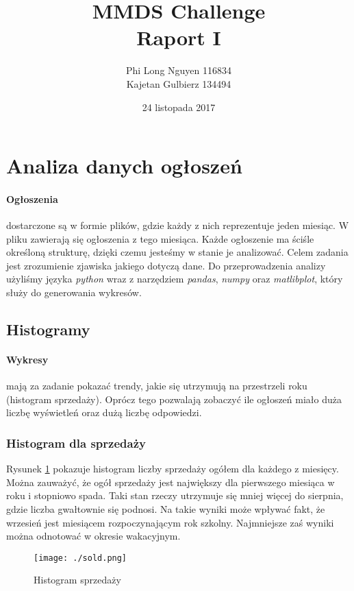 \documentclass[a4paper,11pt]{article}
\author{Phi Long Nguyen 116834 \\ Kajetan Gulbierz 134494}
\title{MMDS Challenge\\
\large{{\bf Raport I}  }}
\date{24 listopada  2017}
\begin{document}
\maketitle 

\section{{Analiza danych ogłoszeń}}
\paragraph{Ogłoszenia} dostarczone są w formie plików, gdzie każdy z nich reprezentuje jeden miesiąc. W pliku zawierają się ogłoszenia z tego miesiąca. Każde ogłoszenie ma ściśle określoną strukturę, dzięki czemu jesteśmy w stanie je analizować. Celem zadania jest zrozumienie zjawiska jakiego dotyczą dane. Do przeprowadzenia analizy użyliśmy języka \textit{python} wraz z narzędziem \textit{pandas}, \textit{numpy} oraz \textit{matlibplot}, który służy do generowania wykresów.  

\subsection{Histogramy}
\paragraph{Wykresy} mają za zadanie pokazać trendy, jakie się utrzymują na przestrzeli roku (histogram sprzedaży). Oprócz tego pozwalają zobaczyć ile ogłoszeń miało duża liczbę wyświetleń oraz dużą liczbę odpowiedzi.\


\subsubsection{Histogram dla sprzedaży} 
Rysunek \ref{fig:automat} pokazuje histogram liczby sprzedaży ogółem dla każdego z miesięcy. Można zauważyć, że ogół sprzedaży jest największy dla pierwszego miesiąca w roku i stopniowo spada. Taki stan rzeczy utrzymuje się mniej więcej do sierpnia, gdzie liczba gwałtownie się podnosi. Na takie wyniki może wpływać fakt, że wrzesień jest miesiącem rozpoczynającym rok szkolny. Najmniejsze zaś wyniki można odnotować w okresie wakacyjnym.  

\begin{figure}[H]
	\centering
	\texttt{[image: ./sold.png]}
	\caption{\label{fig:automat}Histogram sprzedaży}
\end{figure}
\end{document}
